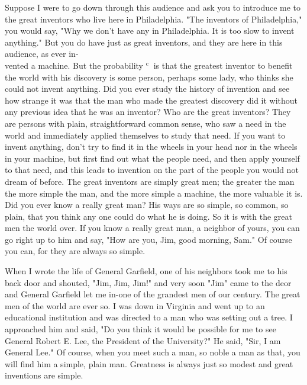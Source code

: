 \documentclass[10pt]{article}
\begin{document}
Suppose I were to go down through this audience and ask you to introduce me to the great inventors who live here in Philadelphia. "The inventors of Philadelphia," you would say, "Why we don't have any in Philadelphia. It is too slow to invent anything." But you do have just as great inventors, and they are here in this audience, as ever in-\\
vented a machine. But the probability ${ }^{\text {c }}$ is that the greatest inventor to benefit the world with his discovery is some person, perhaps some lady, who thinks she could not invent anything. Did you ever study the history of invention and see how strange it was that the man who made the greatest discovery did it without any previous idea that he was an inventor? Who are the great inventors? They are persons with plain, straightforward common sense, who saw a need in the world and immediately applied themselves to study that need. If you want to invent anything, don't try to find it in the wheels in your head nor in the wheels in your machine, but first find out what the people need, and then apply yourself to that need, and this leads to invention on the part of the people you would not dream of before. The great inventors are simply great men; the greater the man the more simple the man, and the more simple a machine, the more valuable it is. Did you ever know a really great man? His ways are so simple, so common, so plain, that you think any one could do what he is doing. So it is with the great men the world over. If you know a really great man, a neighbor of yours, you can go right up to him and say, "How are you, Jim, good morning, Sam." Of course you can, for they are always so simple.

When I wrote the life of General Garfield, one of his neighbors took me to his back door and shouted, "Jim, Jim, Jim!" and very soon "Jim" came to the deor and General Garfield let me in-one of the grandest men of our century. The great men of the world are ever so. I was down in Virginia and went up to an educational institution and was directed to a man who was setting out a tree. I approached him and said, "Do you think it would be possible for me to see General Robert E. Lee, the President of the University?" He said, "Sir, I am General Lee." Of course, when you meet such a man, so noble a man as that, you will find him a simple, plain man. Greatness is always just so modest and great inventions are simple.
\end{document}
